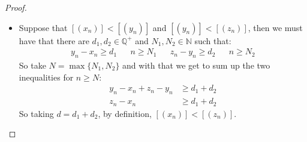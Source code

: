 \documentclass{tufte-handout}
\begin{document}
\begin{proof}
\begin{itemize}
		\item Suppose that $[(x_n)] < [(y_n)]$ and $[(y_n)] < [(z_n)]$, then we must have that there are $d_1, d_2 \in \mathbb{Q}^+$ and $N_1, N_2 \in \mathbb{N}$ such that:
		\begin{align*}
			y_n - x_n \ge d_1 && n \ge N_1 && z_n - y_n \ge d_2 && n \ge N_2
		\end{align*} 
		So take $N = \max\{N_1, N_2\}$ and with that we get to sum up the two inequalities for $n \ge N$:
		\begin{align*}
			y_n - x_n + z_n - y_n &\ge d_1 + d_2\\
			z_n - x_n &\ge d_1 + d_2
		\end{align*}
		So taking $d = d_1 + d_2$, by definition, $[(x_n)] < [(z_n)]$.
	\end{itemize}
\end{proof}
\end{document}
